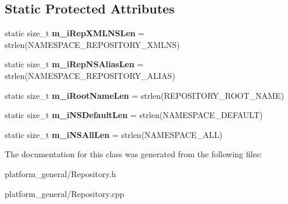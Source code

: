 \subsection*{\-Static \-Protected \-Attributes}
\begin{DoxyCompactItemize}
\item 
\hypertarget{classgeneral__server_1_1Repository_a8ab9a8e38e320e16c91552cfa5decdb9}{static size\-\_\-t {\bfseries m\-\_\-i\-Rep\-X\-M\-L\-N\-S\-Len} = strlen(\-N\-A\-M\-E\-S\-P\-A\-C\-E\-\_\-\-R\-E\-P\-O\-S\-I\-T\-O\-R\-Y\-\_\-\-X\-M\-L\-N\-S)}\label{classgeneral__server_1_1Repository_a8ab9a8e38e320e16c91552cfa5decdb9}

\item 
\hypertarget{classgeneral__server_1_1Repository_acb2fb649867d66f2eeb27a99bebbce2d}{static size\-\_\-t {\bfseries m\-\_\-i\-Rep\-N\-S\-Alias\-Len} = strlen(\-N\-A\-M\-E\-S\-P\-A\-C\-E\-\_\-\-R\-E\-P\-O\-S\-I\-T\-O\-R\-Y\-\_\-\-A\-L\-I\-A\-S)}\label{classgeneral__server_1_1Repository_acb2fb649867d66f2eeb27a99bebbce2d}

\item 
\hypertarget{classgeneral__server_1_1Repository_abe62c406c47d7f5828b0ad52594d8d40}{static size\-\_\-t {\bfseries m\-\_\-i\-Root\-Name\-Len} = strlen(\-R\-E\-P\-O\-S\-I\-T\-O\-R\-Y\-\_\-\-R\-O\-O\-T\-\_\-\-N\-A\-M\-E)}\label{classgeneral__server_1_1Repository_abe62c406c47d7f5828b0ad52594d8d40}

\item 
\hypertarget{classgeneral__server_1_1Repository_a0f791518ec30721c74af435235fa3b0c}{static size\-\_\-t {\bfseries m\-\_\-i\-N\-S\-Default\-Len} = strlen(\-N\-A\-M\-E\-S\-P\-A\-C\-E\-\_\-\-D\-E\-F\-A\-U\-L\-T)}\label{classgeneral__server_1_1Repository_a0f791518ec30721c74af435235fa3b0c}

\item 
\hypertarget{classgeneral__server_1_1Repository_a85e775b8cd7fdaf80c76324cf515d255}{static size\-\_\-t {\bfseries m\-\_\-i\-N\-S\-All\-Len} = strlen(\-N\-A\-M\-E\-S\-P\-A\-C\-E\-\_\-\-A\-L\-L)}\label{classgeneral__server_1_1Repository_a85e775b8cd7fdaf80c76324cf515d255}

\end{DoxyCompactItemize}


\-The documentation for this class was generated from the following files\-:\begin{DoxyCompactItemize}
\item 
platform\-\_\-general/\-Repository.\-h\item 
platform\-\_\-general/\-Repository.\-cpp\end{DoxyCompactItemize}
